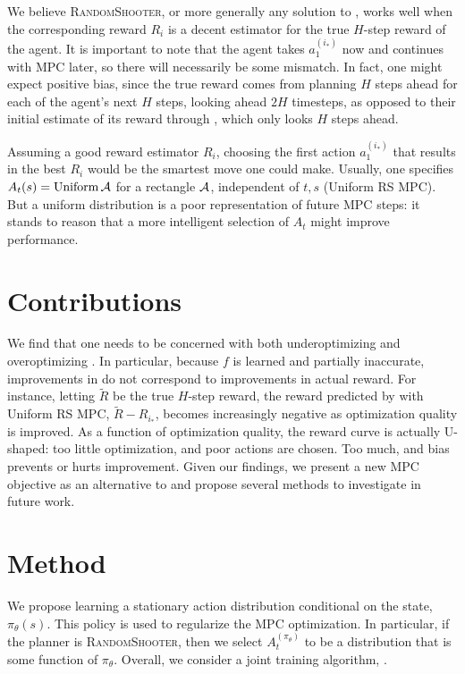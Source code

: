 \documentclass{article}
\begin{document}
We believe \textsc{RandomShooter}, or more generally any solution to , works well when the corresponding reward $R_i$ is a decent estimator for the true $H$-step reward of the agent. It is important to note that the agent takes $a_1^{(i_*)}$ now and continues with \textsc{MPC} later, so there will necessarily be some mismatch. In fact, one might expect positive bias, since the true reward comes from planning $H$ steps ahead for each of the agent's next $H$ steps, looking ahead $2H$ timesteps, as opposed to their initial estimate of its reward through , which only looks $H$ steps ahead.

Assuming a good reward estimator $R_i$, choosing the first action $a_1^{(i_*)}$ that results in the best $R_i$ would be the smartest move one could make. Usually, one specifies $A_t(s)=\operatorname{Uniform} \mathcal{A}$ for a rectangle $\mathcal{A}$, independent of $t,s$ (Uniform RS MPC). But a uniform distribution is a poor representation of future \textsc{MPC} steps: it stands to reason that a more intelligent selection of $A_t$ might improve performance.

\section{Contributions}

We find that one needs to be concerned with both underoptimizing and overoptimizing . In particular, because $f$ is learned and partially inaccurate, improvements in  do not correspond to improvements in actual reward. For instance, letting $\tilde R$ be the true $H$-step reward, the reward predicted by  with Uniform RS MPC, $\tilde R - R_{i_*}$, becomes increasingly negative as optimization quality is improved. As a function of optimization quality, the reward curve is actually U-shaped: too little optimization, and poor actions are chosen. Too much, and bias prevents or hurts improvement. Given our findings, we present a new MPC objective as an alternative to  and propose several methods to investigate in future work.

\section{Method}

We propose learning a stationary action distribution conditional on the state, $\pi_\theta(s)$. This policy is used to regularize the MPC optimization. In particular, if the planner is \textsc{RandomShooter}, then we select $A_t^{(\pi_\theta)}$ to be a distribution that is some function of $\pi_\theta$. Overall, we consider a joint training algorithm, .
\end{document}

